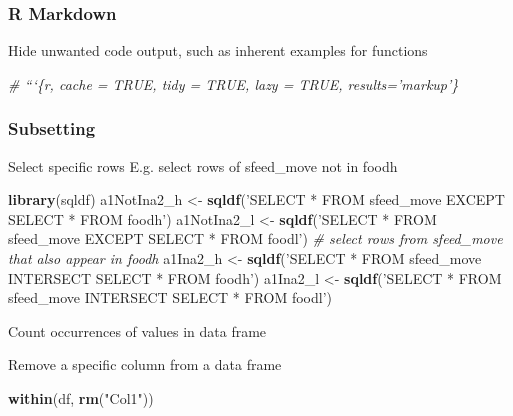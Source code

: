 \documentclass[10,portrait]{article}
\newenvironment{Shaded}{\begin{snugshade}}{\end{snugshade}}
\newcommand{\KeywordTok}[1]{\textcolor[rgb]{0.13,0.29,0.53}{\textbf{#1}}}
\newcommand{\StringTok}[1]{\textcolor[rgb]{0.31,0.60,0.02}{#1}}
\newcommand{\CommentTok}[1]{\textcolor[rgb]{0.56,0.35,0.01}{\textit{#1}}}
\newcommand{\OperatorTok}[1]{\textcolor[rgb]{0.81,0.36,0.00}{\textbf{#1}}}
\newcommand{\NormalTok}[1]{#1}
\begin{document}
\subsubsection{R Markdown}\label{r-markdown}

Hide unwanted code output, such as inherent examples for functions

\begin{Shaded}
\begin{Highlighting}[]
\CommentTok{# ```\{r, cache = TRUE, tidy = TRUE, lazy = TRUE, results='markup'\}}
\end{Highlighting}
\end{Shaded}

\subsubsection{Subsetting}\label{subsetting}

Select specific rows E.g. select rows of sfeed\_move not in foodh

\begin{Shaded}
\begin{Highlighting}[]
\KeywordTok{library}\NormalTok{(sqldf)}
\NormalTok{a1NotIna2_h  <-}\StringTok{ }\KeywordTok{sqldf}\NormalTok{(}\StringTok{'SELECT * FROM sfeed_move EXCEPT SELECT * FROM foodh'}\NormalTok{)}
\NormalTok{a1NotIna2_l  <-}\StringTok{ }\KeywordTok{sqldf}\NormalTok{(}\StringTok{'SELECT * FROM sfeed_move EXCEPT SELECT * FROM foodl'}\NormalTok{)}
\CommentTok{# select rows from sfeed_move that also appear in foodh}
\NormalTok{a1Ina2_h  <-}\StringTok{ }\KeywordTok{sqldf}\NormalTok{(}\StringTok{'SELECT * FROM sfeed_move INTERSECT SELECT * FROM foodh'}\NormalTok{)}
\NormalTok{a1Ina2_l  <-}\StringTok{ }\KeywordTok{sqldf}\NormalTok{(}\StringTok{'SELECT * FROM sfeed_move INTERSECT SELECT * FROM foodl'}\NormalTok{)}
\end{Highlighting}
\end{Shaded}

Count occurrences of values in data frame

\begin{Shaded}
\end{Shaded}

Remove a specific column from a data frame

\begin{Shaded}
\begin{Highlighting}[]
\KeywordTok{within}\NormalTok{(df, }\KeywordTok{rm}\NormalTok{(}\StringTok{"Col1"}\NormalTok{))}
\end{Highlighting}
\end{Shaded}
\end{document}
